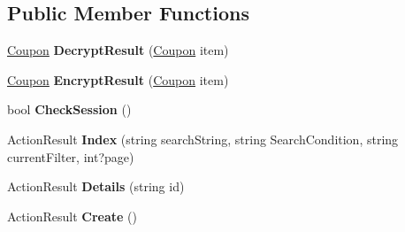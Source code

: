 \subsection*{Public Member Functions}
\begin{DoxyCompactItemize}
\item 
\hyperlink{class_cloud_bread_admin_web_1_1_coupon}{Coupon} {\bfseries Decrypt\+Result} (\hyperlink{class_cloud_bread_admin_web_1_1_coupon}{Coupon} item)\hypertarget{class_cloud_bread_admin_web_1_1_controllers_1_1_coupons_controller_a0d78b9300023d4d572cccdf5fc272782}{}\label{class_cloud_bread_admin_web_1_1_controllers_1_1_coupons_controller_a0d78b9300023d4d572cccdf5fc272782}

\item 
\hyperlink{class_cloud_bread_admin_web_1_1_coupon}{Coupon} {\bfseries Encrypt\+Result} (\hyperlink{class_cloud_bread_admin_web_1_1_coupon}{Coupon} item)\hypertarget{class_cloud_bread_admin_web_1_1_controllers_1_1_coupons_controller_aeac3ad1dcd55d98bac7c27caee440ca4}{}\label{class_cloud_bread_admin_web_1_1_controllers_1_1_coupons_controller_aeac3ad1dcd55d98bac7c27caee440ca4}

\item 
bool {\bfseries Check\+Session} ()\hypertarget{class_cloud_bread_admin_web_1_1_controllers_1_1_coupons_controller_ae05fb87ce1e4b4a3b40c12edb26c2813}{}\label{class_cloud_bread_admin_web_1_1_controllers_1_1_coupons_controller_ae05fb87ce1e4b4a3b40c12edb26c2813}

\item 
Action\+Result {\bfseries Index} (string search\+String, string Search\+Condition, string current\+Filter, int?page)\hypertarget{class_cloud_bread_admin_web_1_1_controllers_1_1_coupons_controller_a17770c0afe56bfa23bb1feef7f0422f4}{}\label{class_cloud_bread_admin_web_1_1_controllers_1_1_coupons_controller_a17770c0afe56bfa23bb1feef7f0422f4}

\item 
Action\+Result {\bfseries Details} (string id)\hypertarget{class_cloud_bread_admin_web_1_1_controllers_1_1_coupons_controller_aba233e999b886228c0f32aeb09956e21}{}\label{class_cloud_bread_admin_web_1_1_controllers_1_1_coupons_controller_aba233e999b886228c0f32aeb09956e21}

\item 
Action\+Result {\bfseries Create} ()\hypertarget{class_cloud_bread_admin_web_1_1_controllers_1_1_coupons_controller_ab20df87a2e111f5132be283dfb6218b4}{}\label{class_cloud_bread_admin_web_1_1_controllers_1_1_coupons_controller_ab20df87a2e111f5132be283dfb6218b4}


\end{DoxyCompactItemize}

